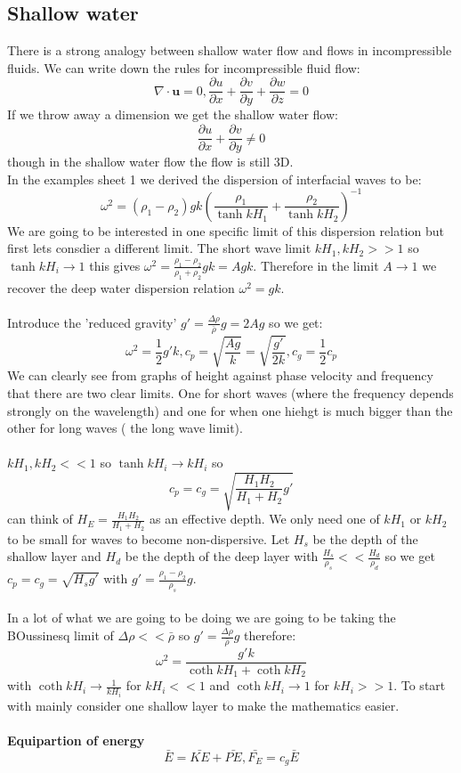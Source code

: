 \documentclass{article}
\begin{document}
\subsection{Shallow water}
There is a strong analogy between shallow water flow and flows in incompressible fluids. We can write down the rules for incompressible fluid flow:
$$
\nabla \cdot \bm u = 0, \frac{\partial u}{\partial x} + \frac{\partial v}{\partial y} + \frac{\partial w}{\partial z} = 0
$$
If we throw away a dimension we get the shallow water flow:
$$
\frac{\partial u}{\partial x} + \frac{\partial v}{\partial y} \neq 0
$$
though in the shallow water flow the flow is still 3D.\\
In the examples sheet 1 we derived the dispersion of interfacial waves to be:
$$
\omega^2 = (\rho_1 - \rho_2) g k ( \frac{\rho_1}{\tanh kH_1} + \frac{\rho_2}{\tanh kH_2})^{-1}
$$
We are going to be interested in one specific limit of this dispersion relation but first lets consdier a different limit. The short wave limit $kH_1 , kH_2 >>1$ so $\tanh kH_i \rightarrow 1$ this gives $\omega^2 = \frac{\rho_1 - \rho_2}{\rho_1 + \rho_2} g k = A gk$. Therefore in the limit $ A \rightarrow 1$ we recover the deep water dispersion relation $\omega^2 = gk$.\\\\
Introduce the 'reduced gravity' $ g' = \frac{\Delta \rho}{\bar \rho} g = 2 A g$ so we get:
$$
\omega^2 = \frac{1}{2} g' k, c_p = \sqrt{ \frac{Ag}{k}} = \sqrt{ \frac{g'}{2k}}, c_g = \frac{1}{2} c_p
$$
We can clearly see from graphs of height against phase velocity and frequency that there are two clear limits. One for short waves (where the frequency depends strongly on the wavelength) and one for when one hiehgt is much bigger than the other for long waves ( the long wave limit).\\\\
$kH_1, kH_2 << 1$ so $\tanh kH_i \rightarrow kH_i$ so 
$$
c_p = c_g = \sqrt{ \frac{ H_1H_2}{H_1 + H_2} g'}
$$
can think of $H_E = \frac{H_1 H_2}{H_1 + H_2}$ as an effective depth. We only need one of $kH_1 $ or $kH_2$ to be small for waves to become non-dispersive. Let $H_s$ be the depth of the shallow layer and $H_d$ be the depth of the deep layer with $\frac{H_s}{\rho_s} << \frac{H_d}{\rho_d}$ so we get $c_p = c_g = \sqrt{ H_s g'}$ with $g' = \frac{\rho_1 - \rho_2}{\rho_s} g$. \\\\
In a lot of what we are going to be doing we are going to be taking the BOussinesq limit of $\Delta \rho << \bar \rho$ so $g' = \frac{\Delta \rho}{\bar \rho} g$ therefore:
$$
\omega^2 = \frac{g' k}{\coth kH_1 + \coth k H_2} 
$$
with $\coth kH_i \rightarrow \frac{1}{kH_i}$ for $kH_i <<1$ and $\coth kH_i \rightarrow 1 $ for $kH_i>>1$. To start with mainly consider one shallow layer to make the mathematics easier.\\\\
\textbf{Equipartion of energy}
$$
\bar E = \bar{KE} + \bar{PE}, \bar{F_E} = c_g \bar E
$$
\end{document}

